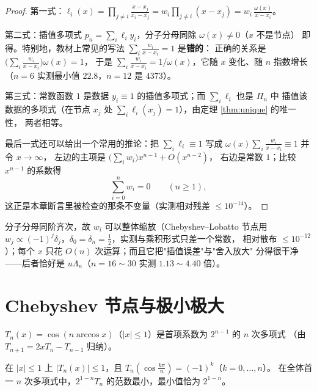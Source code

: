 \begin{proof}
第一式：$\ell_i(x)=\prod_{j\ne i}\frac{x-x_j}{x_i-x_j}
=w_i\prod_{j\ne i}(x-x_j)=w_i\,\frac{\omega(x)}{x-x_i}$。

第二式：插值多项式 $p_n=\sum_i\ell_i y_i$，分子分母同除 $\omega(x)\ne0$（$x$ 不是节点）
即得。特别地，教材上常见的写法 $\sum_i\frac{w_i}{x-x_i}=1$ 是\textbf{错的}：
正确的关系是 $\bigl(\sum_i\frac{w_i}{x-x_i}\bigr)\omega(x)=1$，
于是 $\sum_i\frac{w_i}{x-x_i}=1/\omega(x)$，它随 $x$ 变化、随 $n$ 指数增长
（$n=6$ 实测最小值 $22.8$，$n=12$ 是 $4373$）。

第三式：常数函数 $1$ 是数据 $y_i\equiv1$ 的插值多项式；而 $\sum_i\ell_i$ 也是 $\Pi_n$ 中
插值该数据的多项式（在节点 $x_j$ 处 $\sum_i\ell_i(x_j)=1$），由定理 \ref{thm:unique} 的唯一性，
两者相等。

最后一式还可以给出一个常用的推论：把 $\sum_i\ell_i\equiv1$ 写成
$\omega(x)\sum_i\frac{w_i}{x-x_i}\equiv1$ 并令 $x\to\infty$，
左边的主项是 $\bigl(\sum_iw_i\bigr)x^{n-1}+O(x^{n-2})$，
右边是常数 $1$；比较 $x^{n-1}$ 的系数得
\[
  \sum_{i=0}^{n}w_i=0\qquad(n\ge1),
\]
这正是本章断言里被检查的那条不变量（实测相对残差 $\le10^{-14}$）。
\end{proof}

\begin{remark}[为什么工程上默认用重心形式]
分子分母同阶齐次，故 $w_i$ 可以整体缩放（Chebyshev--Lobatto 节点用
$w_j\propto(-1)^j\delta_j$，$\delta_0=\delta_n=\frac12$，实测与乘积形式只差一个常数，
相对散布 $\le10^{-12}$）；每个 $x$ 只花 $O(n)$ 次运算；而且它把"插值误差"与"舍入放大"
分得很干净——后者恰好是 $u\Lambda_n$（$n=16\sim30$ 实测 $1.13\sim4.40$ 倍）。
\end{remark}

\section{Chebyshev 节点与极小极大}

\begin{definition}
$T_n(x)=\cos(n\arccos x)$（$|x|\le1$）是首项系数为 $2^{n-1}$ 的 $n$ 次多项式
（由 $T_{n+1}=2xT_n-T_{n-1}$ 归纳）。
\end{definition}

\begin{theorem}[极小极大性质]
\label{thm:minimax}
在 $|x|\le1$ 上 $|T_n(x)|\le1$，且 $T_n(\cos\frac{k\pi}{n})=(-1)^k$（$k=0,\dots,n$）。
在全体首一 $n$ 次多项式中，$2^{1-n}T_n$ 的范数最小，最小值恰为 $2^{1-n}$。
\end{theorem}

